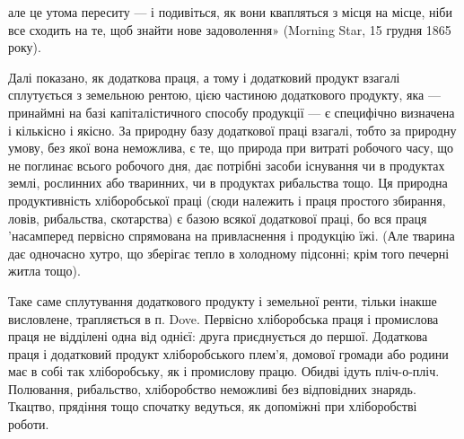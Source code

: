 \parcont{}  %
але це утома переситу — і подивіться, як вони квапляться з місця на місце,
ніби все сходить на те, щоб знайти нове задоволення» (Morning Star, 15 грудня
1865 року).

Далі показано, як додаткова праця, а тому і додатковий продукт взагалі
сплутується з земельною рентою, цією частиною додаткового продукту, яка —
принаймні на базі капіталістичного способу продукції — є специфічно визначена
і кількісно і якісно. За природну базу додаткової праці взагалі, тобто за
природну умову, без якої вона неможлива, є те, що природа при витраті робочого
часу, що не поглинає всього робочого дня, дає потрібні засоби існування
чи в продуктах землі, рослинних або тваринних, чи в продуктах рибальства тощо.
Ця природна продуктивність хліборобської праці (сюди належить і праця простого
збирання, ловів, рибальства, скотарства) є базою всякої додаткової праці, бо вся
праця 'насамперед первісно спрямована на привласнення і продукцію їжі. (Але
тварина дає одночасно хутро, що зберігає тепло в холодному підсонні; крім того
печерні житла тощо).

Таке саме сплутування додаткового продукту і земельної ренти, тільки
інакше висловлене, трапляється в п. Dove. Первісно хліборобська праця і промислова
праця не відділені одна від однієї: друга приєднується до першої.
Додаткова праця і додатковий продукт хліборобського плем’я, домової громади
або родини має в собі так хліборобську, як і промислову працю. Обидві ідуть
пліч-о-пліч. Полювання, рибальство, хліборобство неможливі без відповідних
знарядь. Ткацтво, прядіння тощо спочатку ведуться, як допоміжні при хліборобстві
роботи.

